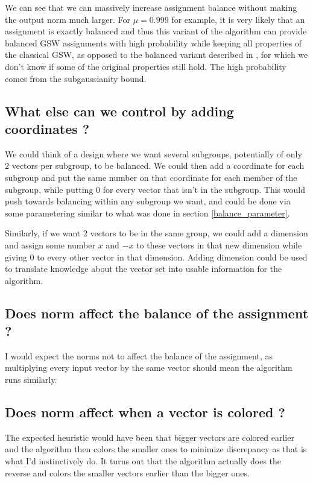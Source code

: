 \documentclass[12pt]{article}
\begin{document}
We can see that we can massively increase assignment balance without making the output norm much larger. For $\mu=0.999$ for example, it is very likely that an assignment is exactly balanced and thus this variant of the algorithm can provide balanced GSW assignments with high probability while keeping all properties of the classical GSW, as opposed to the balanced variant described in \cite{harshaw2019balancing}, for which we don't know if some of the original properties still hold. The high probability comes from the subgaussianity bound.

\subsection{What else can we control by adding coordinates ?}
We could think of a design where we want several subgroups, potentially of only 2 vectors per subgroup, to be balanced. We could then add a coordinate for each subgroup and put the same number on that coordinate for each member of the subgroup, while putting 0 for every vector that isn't in the subgroup. This would push towards balancing within any subgroup we want, and could be done via some parametering similar to what was done in section \ref{balance_parameter}. 

Similarly, if we want 2 vectors to be in the same group, we could add a dimension and assign some number $x$ and $-x$ to these vectors in that new dimension while giving 0 to every other vector in that dimension. Adding dimension could be used to translate knowledge about the vector set into usable information for the algorithm.



\subsection{Does norm affect the balance of the assignment ?}
I would expect the norms not to affect the balance of the assignment, as multiplying every input vector by the same vector should mean the algorithm runs similarly.

\subsection{Does norm affect when a vector is colored ?}\label{norm_affect_when}
The expected heuristic would have been that bigger vectors are colored earlier and the algorithm then colors the smaller ones to minimize discrepancy as that is what I'd instinctively do. It turns out that the algorithm actually does the reverse and colors the smaller vectors earlier than the bigger ones.
\end{document}
